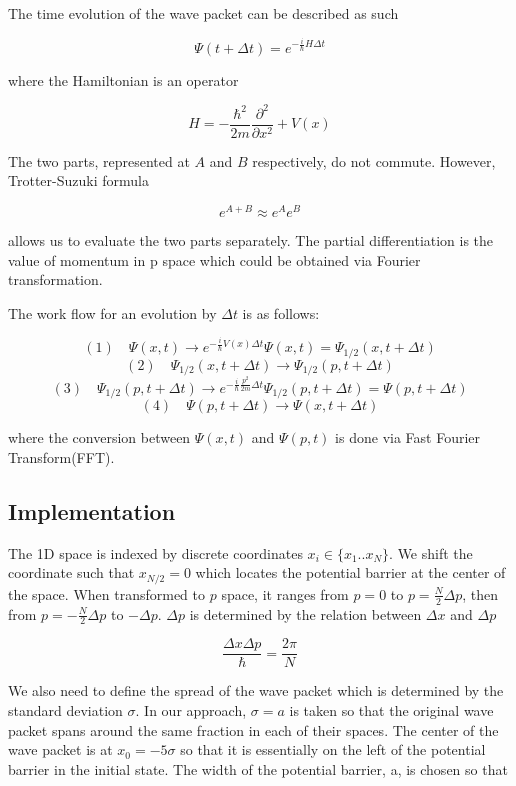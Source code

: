 \documentclass{article}
\begin{document}
The time evolution of the wave packet can be described as such

$$\Psi(t+\Delta t) = e^{-\frac{i}{\hbar} H \Delta t}$$

where the Hamiltonian is an operator

$$H = - \frac{\hbar^2}{2m} \frac{\partial^2}{\partial x^2} + V(x)$$

The two parts, represented at $A$ and $B$ respectively, do not
commute. However, Trotter-Suzuki formula

$$e^{A+B} \approx e^A e^B$$

allows us to evaluate the two parts separately. The partial
differentiation is the value of momentum in p space which could be
obtained via Fourier transformation.

The work flow for an evolution by $\Delta t$ is as follows:

$$(1)\quad \Psi(x, t) \to e^{-\frac{i}{\hbar}V(x) \Delta t}\Psi(x,t) = \Psi_{1/2}(x, t + \Delta t)$$
$$(2) \quad \Psi_{1/2}(x, t+\Delta t) \to \Psi_{1/2}(p, t+ \Delta t)$$
$$(3) \quad \Psi_{1/2}(p, t+\Delta t) \to e^{-\frac{i}{\hbar} \frac{p^2}{2m} \Delta t}\Psi_{1/2}(p, t + \Delta t) = \Psi(p, t + \Delta t)$$
$$(4) \quad \Psi(p, t+\Delta t) \to \Psi(x, t+\Delta t)$$

where the conversion between $\Psi(x, t)$ and $\Psi(p, t)$ is done via Fast Fourier Transform(FFT).


\subsection{Implementation}
\label{sec-2-2}

The 1D space is indexed by discrete coordinates $x_i \in \{x_1
   .. x_N\}$. We shift the coordinate such that $x_{N/2} = 0$ which
locates the potential barrier at the center of the space. When
transformed to $p$ space, it ranges from $p = 0$ to $p =
   \frac{N}{2} \Delta p$, then from $p = -\frac{N}{2}\Delta p$ to
$-\Delta p$. $\Delta p$ is determined by the relation between $\Delta x$ and $\Delta p$

$$\frac{\Delta x \Delta p}{\hbar} = \frac{2\pi}{N}$$

We also need to define the spread of the wave packet which is
determined by the standard deviation $\sigma$. In our approach,
$\sigma = a$ is taken so that the original wave packet spans around
the same fraction in each of their spaces. The center of the wave
packet is at $x_0 = -5 \sigma$ so that it is essentially on the
left of the potential barrier in the initial state. The width of
the potential barrier, a, is chosen so that
\end{document}
